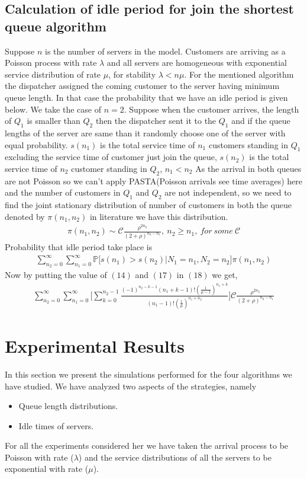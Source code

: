\documentclass[a4paper,english,12pt]{article}
\begin{document}
\subsection{Calculation of idle period for join the shortest queue algorithm} 
Suppose $n$ is the number of servers in the model. Customers are arriving as a  Poisson process with rate $\lambda$ and all servers are homogeneous with exponential service distribution of rate $\mu$, for stability $\lambda < n\mu$. For the mentioned algorithm the dispatcher assigned the coming customer to the server having minimum queue length. In that case the probability that we have an idle period is given below. We take the case of $n=2$. Suppose when the customer arrives, the length of $Q_1$ is smaller than $Q_2$ then the dispatcher sent it to the $Q_1$ and if the queue lengths of the server are same than it randomly choose one of the server with equal probability. $s(n_1)$ is the total service time of $n_1$ customers standing in $Q_1$ excluding the service time of customer just join the queue, $s(n_2)$ is the total service time of $n_2$ customer standing in $Q_2$, $n_1<n_2$ As the arrival in both queues are not Poisson so we can't apply PASTA(Poisson arrivals see time averages) here and the number of customers in $Q_1$ and $Q_2$ are not independent, so we need to find the joint stationary distribution of number of customers in both the queue denoted by $\pi(n_1,n_2)$ in literature we have this distribution.
\begin{align}
\pi(n_1,n_2) \sim \mathcal{C} \frac{\rho ^{2n_2}}{(2+\rho)^{n_2-n_1}}, \ n_2\geq n_1, \ for \ some \ \mathcal{C}
\end{align}
Probability that idle period take place is 
\begin{align}
\sum_{n_2=0}^{\infty}\sum_{n_1=0}^{\infty} \mathbb{P}\bigg[s(n_1) > s(n_2) | N_1 =n_1, N_2 =n_2\bigg] \pi(n_1,n_2)
\end{align}
Now by putting the value of $(14)$ and $(17)$ in $(18)$ we get,
\begin{align}
 \sum_{n_2=0}^{\infty}\sum_{n_1=0}^{\infty} \bigg[\sum_{k=0}^{n_2-1}\frac{(-1)^{n_2-k-1}(n_1+k-1)!(\frac{1}{\mu-1})^{n_1+k}}{(n_1-1)!(\frac{1}{\mu})^{n_1+   n_2}} \bigg] \mathcal{C} \frac{\rho ^{2n_2}}{(2+\rho)^{n_2-n_1}}
\end{align} 
\section{Experimental Results}
In this section we present the simulations performed for the four algorithms we have studied. We have analyzed two aspects of the strategies, namely
\begin{itemize}
\item Queue length distributions.
\item Idle times of servers.

\end{itemize}
For all the experiments considered her we have taken the arrival process to be Poisson with rate ($\lambda$) and the service distributions of all the servers to be exponential with rate ($\mu$). 
\end{document}
